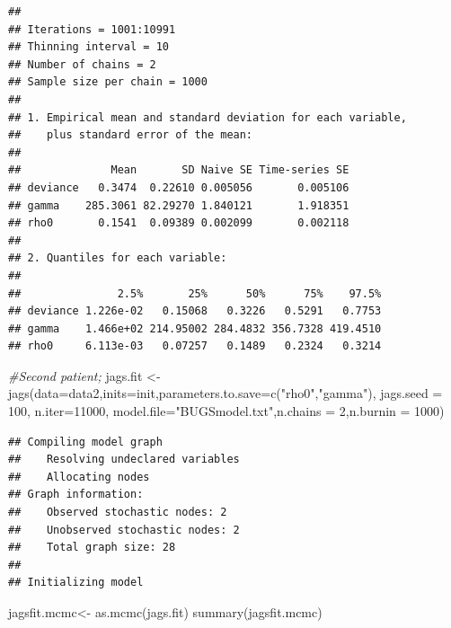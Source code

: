\documentclass[
]{article}
\newenvironment{Shaded}{\begin{snugshade}}{\end{snugshade}}
\newcommand{\AttributeTok}[1]{\textcolor[rgb]{0.77,0.63,0.00}{#1}}
\newcommand{\CommentTok}[1]{\textcolor[rgb]{0.56,0.35,0.01}{\textit{#1}}}
\newcommand{\DecValTok}[1]{\textcolor[rgb]{0.00,0.00,0.81}{#1}}
\newcommand{\FunctionTok}[1]{\textcolor[rgb]{0.00,0.00,0.00}{#1}}
\newcommand{\NormalTok}[1]{#1}
\newcommand{\OtherTok}[1]{\textcolor[rgb]{0.56,0.35,0.01}{#1}}
\newcommand{\StringTok}[1]{\textcolor[rgb]{0.31,0.60,0.02}{#1}}
\begin{document}
\begin{verbatim}
## 
## Iterations = 1001:10991
## Thinning interval = 10 
## Number of chains = 2 
## Sample size per chain = 1000 
## 
## 1. Empirical mean and standard deviation for each variable,
##    plus standard error of the mean:
## 
##              Mean       SD Naive SE Time-series SE
## deviance   0.3474  0.22610 0.005056       0.005106
## gamma    285.3061 82.29270 1.840121       1.918351
## rho0       0.1541  0.09389 0.002099       0.002118
## 
## 2. Quantiles for each variable:
## 
##               2.5%       25%      50%      75%    97.5%
## deviance 1.226e-02   0.15068   0.3226   0.5291   0.7753
## gamma    1.466e+02 214.95002 284.4832 356.7328 419.4510
## rho0     6.113e-03   0.07257   0.1489   0.2324   0.3214
\end{verbatim}

\begin{Shaded}
\begin{Highlighting}[]
\CommentTok{\#Second patient;}
\NormalTok{jags.fit }\OtherTok{\textless{}{-}} \FunctionTok{jags}\NormalTok{(}\AttributeTok{data=}\NormalTok{data2,}\AttributeTok{inits=}\NormalTok{init,}\AttributeTok{parameters.to.save=}\FunctionTok{c}\NormalTok{(}\StringTok{"rho0"}\NormalTok{,}\StringTok{"gamma"}\NormalTok{),}
         \AttributeTok{jags.seed =} \DecValTok{100}\NormalTok{, }\AttributeTok{n.iter=}\DecValTok{11000}\NormalTok{, }\AttributeTok{model.file=}\StringTok{"BUGSmodel.txt"}\NormalTok{,}\AttributeTok{n.chains =} \DecValTok{2}\NormalTok{,}\AttributeTok{n.burnin =} \DecValTok{1000}\NormalTok{)}
\end{Highlighting}
\end{Shaded}

\begin{verbatim}
## Compiling model graph
##    Resolving undeclared variables
##    Allocating nodes
## Graph information:
##    Observed stochastic nodes: 2
##    Unobserved stochastic nodes: 2
##    Total graph size: 28
## 
## Initializing model
\end{verbatim}

\begin{Shaded}
\begin{Highlighting}[]
\NormalTok{jagsfit.mcmc}\OtherTok{\textless{}{-}} \FunctionTok{as.mcmc}\NormalTok{(jags.fit)}
\FunctionTok{summary}\NormalTok{(jagsfit.mcmc)}
\end{Highlighting}
\end{Shaded}
\end{document}
